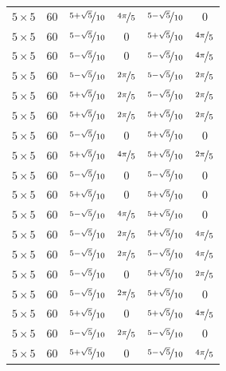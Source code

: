 \documentclass{article}
\begin{document}
\begin{longtable}{cccccc}
$5 \times 5$ & 60 & $\nicefrac{5+\sqrt{5}}{10}$ & $\nicefrac{4\pi}{5}$ & $\nicefrac{5-\sqrt{5}}{10}$ & 0 \\
$5 \times 5$ & 60 & $\nicefrac{5-\sqrt{5}}{10}$ & 0 & $\nicefrac{5+\sqrt{5}}{10}$ & $\nicefrac{4\pi}{5}$ \\
$5 \times 5$ & 60 & $\nicefrac{5-\sqrt{5}}{10}$ & 0 & $\nicefrac{5-\sqrt{5}}{10}$ & $\nicefrac{4\pi}{5}$ \\
$5 \times 5$ & 60 & $\nicefrac{5-\sqrt{5}}{10}$ & $\nicefrac{2\pi}{5}$ & $\nicefrac{5-\sqrt{5}}{10}$ & $\nicefrac{2\pi}{5}$ \\
$5 \times 5$ & 60 & $\nicefrac{5+\sqrt{5}}{10}$ & $\nicefrac{2\pi}{5}$ & $\nicefrac{5-\sqrt{5}}{10}$ & $\nicefrac{2\pi}{5}$ \\
$5 \times 5$ & 60 & $\nicefrac{5+\sqrt{5}}{10}$ & $\nicefrac{2\pi}{5}$ & $\nicefrac{5+\sqrt{5}}{10}$ & $\nicefrac{2\pi}{5}$ \\
$5 \times 5$ & 60 & $\nicefrac{5-\sqrt{5}}{10}$ & 0 & $\nicefrac{5+\sqrt{5}}{10}$ & 0 \\
$5 \times 5$ & 60 & $\nicefrac{5+\sqrt{5}}{10}$ & $\nicefrac{4\pi}{5}$ & $\nicefrac{5+\sqrt{5}}{10}$ & $\nicefrac{2\pi}{5}$ \\
$5 \times 5$ & 60 & $\nicefrac{5-\sqrt{5}}{10}$ & 0 & $\nicefrac{5-\sqrt{5}}{10}$ & 0 \\
$5 \times 5$ & 60 & $\nicefrac{5+\sqrt{5}}{10}$ & 0 & $\nicefrac{5+\sqrt{5}}{10}$ & 0 \\
$5 \times 5$ & 60 & $\nicefrac{5-\sqrt{5}}{10}$ & $\nicefrac{4\pi}{5}$ & $\nicefrac{5+\sqrt{5}}{10}$ & 0 \\
$5 \times 5$ & 60 & $\nicefrac{5-\sqrt{5}}{10}$ & $\nicefrac{2\pi}{5}$ & $\nicefrac{5+\sqrt{5}}{10}$ & $\nicefrac{4\pi}{5}$ \\
$5 \times 5$ & 60 & $\nicefrac{5-\sqrt{5}}{10}$ & $\nicefrac{2\pi}{5}$ & $\nicefrac{5-\sqrt{5}}{10}$ & $\nicefrac{4\pi}{5}$ \\
$5 \times 5$ & 60 & $\nicefrac{5-\sqrt{5}}{10}$ & 0 & $\nicefrac{5+\sqrt{5}}{10}$ & $\nicefrac{2\pi}{5}$ \\
$5 \times 5$ & 60 & $\nicefrac{5-\sqrt{5}}{10}$ & $\nicefrac{2\pi}{5}$ & $\nicefrac{5+\sqrt{5}}{10}$ & 0 \\
$5 \times 5$ & 60 & $\nicefrac{5+\sqrt{5}}{10}$ & 0 & $\nicefrac{5+\sqrt{5}}{10}$ & $\nicefrac{4\pi}{5}$ \\
$5 \times 5$ & 60 & $\nicefrac{5-\sqrt{5}}{10}$ & $\nicefrac{2\pi}{5}$ & $\nicefrac{5-\sqrt{5}}{10}$ & 0 \\
$5 \times 5$ & 60 & $\nicefrac{5+\sqrt{5}}{10}$ & 0 & $\nicefrac{5-\sqrt{5}}{10}$ & $\nicefrac{4\pi}{5}$ \\

\end{longtable}
\end{document}
